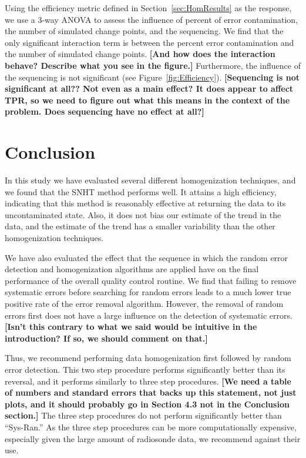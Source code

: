\documentclass[12pt]{article}
\begin{document}
\begin{doublespacing}
Using the efficiency metric defined in Section~\ref{sec:HomResults} as the response,  we use a 3-way ANOVA to assess the influence of percent of error contamination, the number of simulated change points, and the sequencing.  We find that the only significant interaction term is between the percent error contamination and the number of simulated change points.  \textbf{[And how does the interaction behave?  Describe what you see in the figure.]} Furthermore, the influence of the sequencing is not significant (see Figure~\ref{fig:Efficiency}). \textbf{[Sequencing is not significant at all??  Not even as a main effect? It does appear to affect TPR, so we need to figure out what this means in the context of the problem.  Does sequencing have no effect at all?]}

\section{Conclusion}

In this study we have evaluated several different homogenization techniques, and we found that the SNHT method performs well.  It attains a high efficiency, indicating that this method is reasonably effective at returning the data to its uncontaminated state.  Also, it does not bias our estimate of the trend in the data, and the estimate of the trend has a smaller variability than the other homogenization techniques.

We have also evaluated the effect that the sequence in which the random error detection and homogenization algorithms are applied have on the final performance of the overall quality control routine.  We find that failing to remove systematic errors before searching for random errors leads to a much lower true positive rate of the error removal algorithm.  However,  the removal of random errors first does not have a large influence on the detection of systematic errors. \textbf{[Isn't this contrary to what we said would be intuitive in the introduction?  If so, we should comment on that.]}

Thus, we recommend performing data homogenization first followed by random error detection.  This two step procedure performs significantly better than its reversal, and it performs similarly to three step procedures. \textbf{[We need a table of numbers and standard errors that backs up this statement, not just plots, and it should probably go in Section 4.3 not in the Conclusion section.]}  The three step procedures do not perform significantly better than ``Sys-Ran.''  As the three step procedures can be more computationally expensive, especially given the large amount of radiosonde data, we recommend against their use.
\end{doublespacing}
\end{document}
